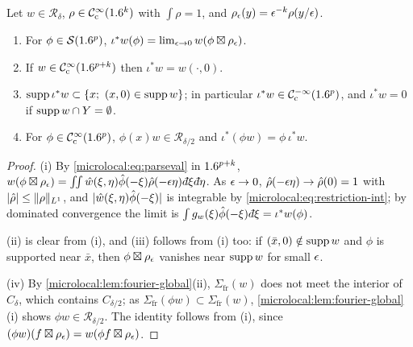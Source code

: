 \begin{lemma}\label{microlocal:lem:restriction}
  Let $w\in\mathcal R_\delta$, $\rho\in\mathcal{C}^\infty_{\mathrm{c}}(1.6^k)$ with $\int\rho=1$, and
  $\rho_\epsilon(y)=\epsilon^{-k}\rho(y/\epsilon)$.
  \begin{enumerate}[label=\textup{(\roman*)}]
  \item For $\phi\in\mathcal{S}(1.6^p)$,
    $\iota^*w(\phi)=\lim_{\epsilon\to0}w(\phi\boxtimes\rho_\epsilon)$.
  \item If $w\in\mathcal{C}^\infty_{\mathrm{c}}(1.6^{p+k})$ then $\iota^*w=w(\cdot,0)$.
  \item $\supp\iota^*w\subset\{x;\ (x,0)\in\supp w\}$; in particular
    $\iota^*w\in\mathcal{C}^{-\infty}_{\mathrm{c}}(1.6^p)$, and $\iota^*w=0$ if $\operatorname{supp} w\cap Y=\emptyset$.
  \item For $\phi\in\mathcal{C}^\infty_{\mathrm{c}}(1.6^p)$, $\phi(x)w\in\mathcal R_{\delta/2}$ and
    $\iota^*(\phi w)=\phi\,\iota^*w$.
  \end{enumerate}
\end{lemma}
\begin{proof}
  (i) By \eqref{microlocal:eq:parseval} in $1.6^{p+k}$,
  $w(\phi\boxtimes\rho_\eps)=\iint\hat w(\xi,\eta)\hat\phi(-\xi)
  \hat\rho(-\eps\eta)\,\dbar\xi\,\dbar\eta$. As $\epsilon\to0$,
  $\hat\rho(-\epsilon\eta)\to\hat\rho(0)=1$ with $\lvert \hat\rho\rvert\le\lVert \rho\rVert_{L^1}$,
  and $\lvert \hat w(\xi,\eta)\hat\phi(-\xi)\rvert$ is integrable by
  \eqref{microlocal:eq:restriction-int}; by dominated convergence the limit is
  $\int g_w(\xi)\hat\phi(-\xi)\,\dbar\xi=\iota^*w(\phi)$.

  (ii) is clear from (i), and (iii) follows from (i) too: if
  $(\bar x,0)\notin\operatorname{supp} w$ and $\phi$ is supported near $\bar x$, then
  $\phi\boxtimes\rho_\epsilon$ vanishes near $\operatorname{supp} w$ for small $\epsilon$.

  (iv) By \cref{microlocal:lem:fourier-global}(ii),
  $\Sigma_{\mathrm{fr}}(w)$ does not meet the interior of $C_\delta$, which contains
  $C_{\delta/2}$; as $\Sigma_{\mathrm{fr}}(\phi w)\subset\Sigma_{\mathrm{fr}}(w)$,
  \cref{microlocal:lem:fourier-global}(i) shows $\phi w\in\mathcal
  R_{\delta/2}$. The identity follows from (i), since
  $(\phi w)(f\boxtimes\rho_\epsilon)=w(\phi f\boxtimes\rho_\epsilon)$.
\end{proof}

